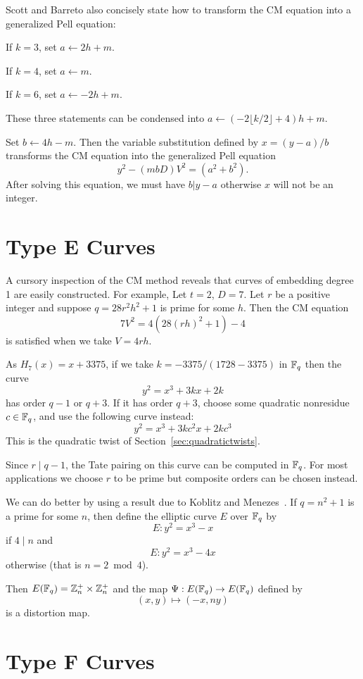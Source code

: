Scott and Barreto also concisely state how to transform the CM equation
into a generalized Pell equation:

If $k = 3$, set $a \gets 2h + m$.

If $k = 4$, set $a \gets m$.

If $k = 6$, set $a \gets -2h + m$.

These three statements can be condensed into
$a \gets (-2 \lfloor k/2 \rfloor + 4)h + m$.

Set $b \gets 4h - m$. Then the variable substitution
defined by $x = (y-a)/b$ transforms the CM equation into the generalized
Pell equation
\[ y^2 - (mbD)V^2 = (a^2 + b^2) .\]
After solving this equation, we must have $b | y - a$ otherwise $x$ will
not be an integer.

\section {Type E Curves}

A cursory inspection of the CM method reveals that
curves of embedding degree 1 are easily constructed. For example,
Let $t = 2$, $D = 7$. Let $r$ be a positive integer
and suppose $q = 28 r^2 h^2 + 1$ is prime for some $h$.
Then the CM equation
\[
7 V^2 = 4 (28 (r h)^2 + 1) - 4
\]
is satisfied when we take $V = 4 r h$.

As $H_7(x) = x + 3375$, if we take $k = -3375 / (1728 - 3375)$ in $\mathbb{F}_q$
then the curve
\[
y^2 = x^3 + 3k x + 2k
\]
has order $q - 1$ or $q + 3$. If it has order $q+3$, choose some
quadratic nonresidue $c \in \mathbb{F}_q$, and use the following curve instead:
\[ y^2 = x^3 + 3 k c^2 x + 2 k c^3 \]
This is the quadratic twist of Section~\ref{sec:quadratictwists}.

Since $r \mid q-1$, the Tate pairing on this curve can be computed
in $\mathbb{F}_q$. For most applications we choose $r$ to be prime but composite
orders can be chosen instead.

We can do better by using a result due to Koblitz and Menezes~\cite{km}.
If $q = n^2 + 1$ is a prime for some $n$, then define the elliptic curve
$E$ over $\mathbb{F}_q$ by
\[E:y^2 = x^3  - x\]
if $4 \mid n$ and
\[E:y^2 = x^3 - 4x\]
otherwise (that is $n = 2 \bmod 4$).

Then $E(\mathbb{F}_q) = \mathbb{Z}_n^+ \times \mathbb{Z}_n^+$ and the map
$\Psi:E(\mathbb{F}_q) \rightarrow E(\mathbb{F}_q)$
defined by
\[(x,y) \mapsto (-x, ny)\]
is a distortion map.

\section {Type F Curves}

